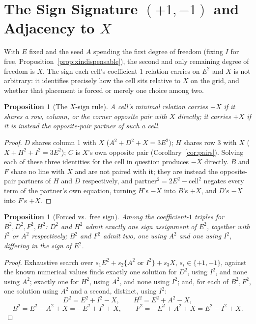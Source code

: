 \documentclass[12pt]{article}
\newtheorem{proposition}[theorem]{Proposition}
\theoremstyle{remark}
\begin{document}
\section{The Sign Signature $(+1,-1)$ and Adjacency to $X$}\label{sec:signature}

With $E$ fixed and the seed $A$ spending the first degree of freedom
(fixing $I$ for free, Proposition~\ref{prop:xindispensable}), the
second and only remaining degree of freedom is $X$. The sign each
cell's coefficient-$1$ relation carries on $E^2$ and $X$ is not
arbitrary: it identifies precisely how the cell sits relative to $X$
on the grid, and whether that placement is forced or merely one choice
among two.

\begin{proposition}[The $X$-sign rule]\label{prop:xsign}
A cell's minimal relation carries $-X$ if it shares a row, column, or
the corner opposite pair with $X$ directly; it carries $+X$ if it is
instead the opposite-pair partner of such a cell.
\end{proposition}

\begin{proof}
$D$ shares column 1 with $X$ ($A^2+D^2+X=3E^2$); $H$ shares row 3 with
$X$ ($X+H^2+I^2=3E^2$); $C$ is $X$'s own opposite pair
(Corollary~\ref{cor:pairs}). Solving each of these three identities
for the cell in question produces $-X$ directly. $B$ and $F$ share no
line with $X$ and are not paired with it; they are instead the
opposite-pair partners of $H$ and $D$ respectively, and
$\mathrm{partner}^2=2E^2-\mathrm{cell}^2$ negates every term of the
partner's own equation, turning $H$'s $-X$ into $B$'s $+X$, and $D$'s
$-X$ into $F$'s $+X$.
\end{proof}

\begin{proposition}[Forced vs.\ free sign]\label{prop:esign}
Among the coefficient-$1$ triples for $B^2,D^2,F^2,H^2$: $D^2$ and
$H^2$ admit exactly one sign assignment of $E^2$, together with $I^2$
or $A^2$ respectively; $B^2$ and $F^2$ admit two, one using $A^2$ and
one using $I^2$, differing in the sign of $E^2$.
\end{proposition}

\begin{proof}
Exhaustive search over $s_1 E^2 + s_2\{A^2 \text{ or } I^2\} + s_3 X$,
$s_i\in\{+1,-1\}$, against the known numerical values finds exactly
one solution for $D^2$, using $I^2$, and none using $A^2$; exactly one
for $H^2$, using $A^2$, and none using $I^2$; and, for each of
$B^2,F^2$, one solution using $A^2$ and a second, distinct, using
$I^2$:
\[
D^2=E^2+I^2-X, \qquad H^2=E^2+A^2-X,
\]
\[
B^2=E^2-A^2+X=-E^2+I^2+X, \qquad F^2=-E^2+A^2+X=E^2-I^2+X .
\]
\end{proof}
\end{document}

